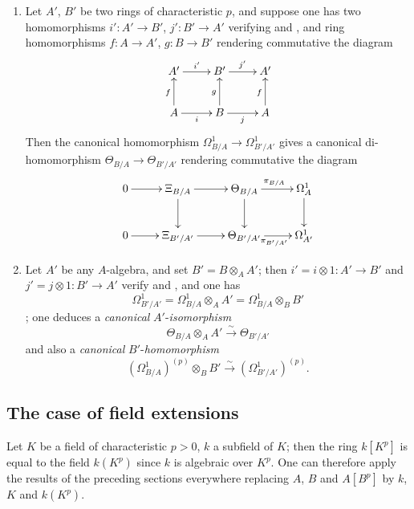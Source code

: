 \begin{remarks}[21.3.6]
\label{0.21.3.6}
\begin{enumerate}
  \item[\rm(i)] Let $A'$, $B'$ be two rings of characteristic $p$, and suppose one has two homomorphisms $i':A'\to B'$, $j':B'\to A'$ verifying  and , and ring homomorphisms $f:A\to A'$, $g:B\to B'$ rendering commutative the diagram
\[
\xymatrix{
  A' \ar[r]^{i'} & B' \ar[r]^{j'} & A' \\
  A \ar[u]^f \ar[r]_{i} & B \ar[u]^g \ar[r]_{j} & A \ar[u]^f
}
\]
Then the canonical homomorphism $\Omega^1_{B/A}\to\Omega^1_{B'/A'}$  gives a canonical di-homomorphism $\Theta_{B/A}\to\Theta_{B'/A'}$ rendering commutative the diagram
\[
\xymatrix{
  0 \ar[r] & \Xi_{B/A} \ar[r] \ar[d] & \Theta_{B/A} \ar[r]^{\pi_{B/A}} \ar[d] & \Omega^1_A \ar[d] \\
  0 \ar[r] & \Xi_{B'/A'} \ar[r] & \Theta_{B'/A'} \ar[r]_{\pi_{B'/A'}} & \Omega^1_{A'}
}
\]

  \item[\rm(ii)] Let $A'$ be any $A$-algebra, and set $B'=B\otimes_A A'$; then $i'=i\otimes 1:A'\to B'$ and $j'=j\otimes 1:B'\to A'$ verify  and , and one has
\[
  \Omega^1_{B'/A'}=\Omega^1_{B/A}\otimes_A A'=\Omega^1_{B/A}\otimes_B B'
\]
; one deduces a \emph{canonical} $A'$-\emph{isomorphism}
\begin{equation}
\tag{21.3.6.1}
  \label{0.21.3.6.1}
  \Theta_{B/A}\otimes_A A'\xrightarrow{\sim}\Theta_{B'/A'}
\end{equation}
and also a \emph{canonical} $B'$-\emph{homomorphism}
\begin{equation}
\tag{21.3.6.2}
  \label{0.21.3.6.2}
  (\Omega^1_{B/A})^{(p)}\otimes_B B'\xrightarrow{\sim}(\Omega^1_{B'/A'})^{(p)}.
\end{equation}
\end{enumerate}
\end{remarks}

\subsection{The case of field extensions}
\label{subsection:0.21.4}

\begin{env}[21.4.0]
\label{0.21.4.0}
Let $K$ be a field of characteristic $p>0$, $k$ a subfield of $K$; then the ring $k[K^p]$ is equal to the field $k(K^p)$ since $k$ is algebraic over $K^p$.
One can therefore apply the results of the preceding sections everywhere replacing $A$, $B$ and $A[B^p]$ by $k$, $K$ and $k(K^p)$.
\end{env}


